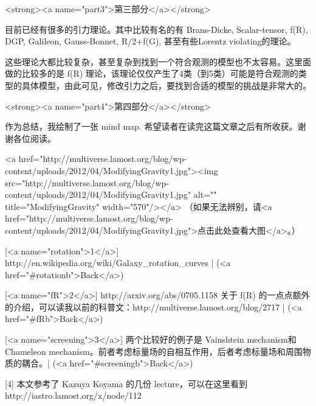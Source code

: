 \documentclass[12pt,a4paper]{article}
\begin{document}
<strong><a name="part3">第三部分</a></strong> 

目前已经有很多的引力理论。其中比较有名的有
Brans-Dicke, Scalar-tensor, f(R), DGP, Galileon, Gauss-Bonnet, R/2+f(G), 
甚至有些Lorentz violating的理论。

这些理论大都比较复杂，甚至复杂到找到一个符合观测的模型也不太容易。这里面做的比较多的是 f(R) 理论，该理论仅仅产生了4类（到5类）可能是符合观测的类型的具体模型，由此可见，修改引力之后，要找到合适的模型的挑战是非常大的。


<strong><a name="part4">第四部分</a></strong> 

作为总结，我绘制了一张 mind map. 希望读者在读完这篇文章之后有所收获。谢谢各位阅读。

<a href="http://multiverse.lamost.org/blog/wp-content/uploads/2012/04/ModifyingGravity1.jpg"><img src="http://multiverse.lamost.org/blog/wp-content/uploads/2012/04/ModifyingGravity1.jpg" alt="" title="ModifyingGravity" width="570"/></a>
（如果无法辨别，请<a href="http://multiverse.lamost.org/blog/wp-content/uploads/2012/04/ModifyingGravity1.jpg">点击此处查看大图</a>。）


[<a name="rotation">1</a>] http://en.wikipedia.org/wiki/Galaxy_rotation_curves     | (<a href="#rotationb">Back</a>)

[<a name="fR">2</a>] http://arxiv.org/abs/0705.1158
关于 f(R) 的一点点额外的介绍，可以读我以前的科普文：http://multiverse.lamost.org/blog/2717  | (<a href="#fRb">Back</a>)

[<a name="screening">3</a>] 两个比较好的例子是 Vainshtein mechanism和 Chameleon mechanism。前者考虑标量场的自相互作用，后者考虑标量场和周围物质的耦合。| (<a href="#screeningb">Back</a>)

[4] 本文参考了 Kazuya Koyama 的几份 lecture，可以在这里看到 http://iastro.lamost.org/x/node/112
\end{document}
